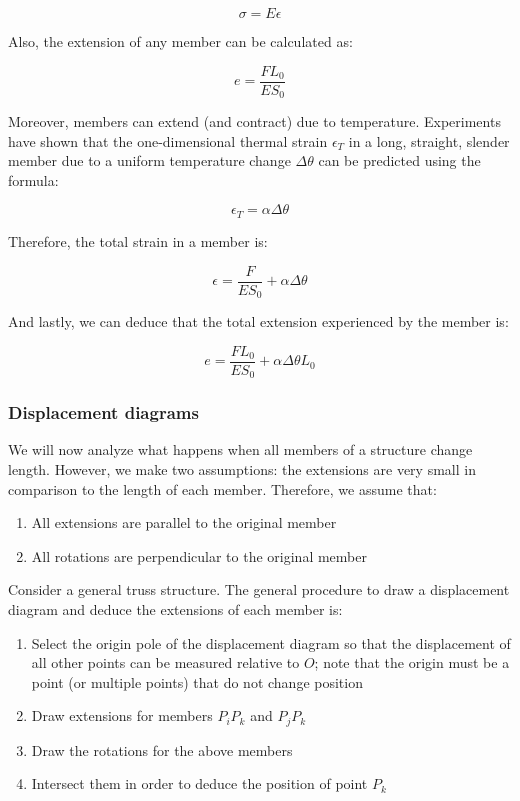 \documentclass{article}
\begin{document}
\[ \sigma = E\epsilon \]

Also, the extension of any member can be calculated as:

\[ e = \frac{FL_0}{ES_0} \]

Moreover, members can extend (and contract) due to temperature. Experiments have shown that the one-dimensional thermal strain $\epsilon_T$ in a long, straight, slender member due to a uniform temperature change $\Delta\theta$ can be predicted using the formula:

\[ \epsilon_T = \alpha\Delta\theta \]

Therefore, the total strain in a member is:

\[ \epsilon = \frac{F}{ES_0} + \alpha\Delta\theta \]

And lastly, we can deduce that the total extension experienced by the member is:

\[ e = \frac{FL_0}{ES_0} + \alpha\Delta\theta L_0 \]

\subsubsection{Displacement diagrams}

We will now analyze what happens when all members of a structure change length. However, we make two assumptions: the extensions are very small in comparison to the length of each member. Therefore, we assume that:

\begin{enumerate}
    \item All extensions are parallel to the original member
    \item All rotations are perpendicular to the original member
\end{enumerate}

Consider a general truss structure. The general procedure to draw a displacement diagram and deduce the extensions of each member is:

\begin{enumerate}
    \item Select the origin pole of the displacement diagram so that the displacement of all other points can be measured relative to $O$; note that the origin must be a point (or multiple points) that do not change position
    \item Draw extensions for members $P_iP_k$ and $P_jP_k$
    \item Draw the rotations for the above members
    \item Intersect them in order to deduce the position of point $P_k$
\end{enumerate}
\end{document}
